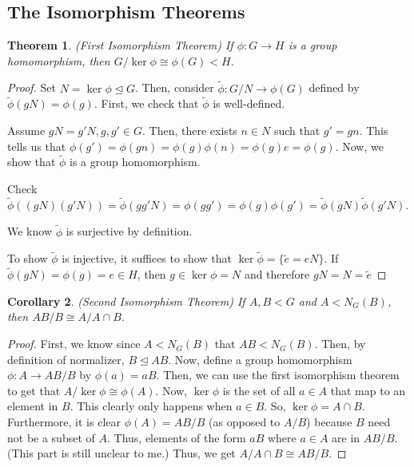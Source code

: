 \documentclass[11pt,leqno,oneside]{amsart}
\newcommand{\subgroup}{\mathrel{<}}
\newcommand{\normsubgroup}{\mathrel{\unlhd}}
\newcommand{\isom}{\mathrel{\cong}}
\newtheorem{thm}{Theorem}[subsection]
\newtheorem{cor}[thm]{Corollary}
\theoremstyle{definition}
\numberwithin{equation}{section}
\begin{document}
\subsection*{The Isomorphism Theorems}
\begin{thm}
    (First Isomorphism Theorem) If $\phi: G \to H$ is a group homomorphism, then $G/\ker \phi \isom \phi(G) \subgroup H$.
\end{thm}
\begin{proof}
    Set $N = \ker \phi \normsubgroup G$. Then, consider $\widetilde{\phi}: G/N
    \to \phi(G)$ defined by $\widetilde{\phi}(gN) = \phi(g)$. First, we check
    that $\widetilde{\phi}$ is well-defined.

    Assume $gN = g'N, g,g' \in G$. Then, there exists $n \in N$ such that $g'
    = gn$. This tells us that $\phi(g') = \phi(gn) = \phi(g)\phi(n) = \phi(g)e
    = \phi(g)$. Now, we show that $\widetilde{\phi}$ is a group homomorphism.

    Check $\widetilde{\phi}( (gN)(g'N) ) = \widetilde{\phi}(gg'N) = \phi(gg') =
    \phi(g)\phi(g') = \widetilde{\phi}(gN) \widetilde{\phi}(g'N)$.

    We know $\widetilde{\phi}$ is surjective by definition.

    To show $\widetilde{\phi}$ is injective, it suffices to show that $\ker
    \widetilde{\phi} = \{\widetilde{e} = eN\}$. If $\widetilde{\phi}(gN) =
    \phi(g) = e \in H$, then $g \in \ker \phi = N$ and therefore $gN = N =
    \widetilde{e}$
\end{proof}
\begin{cor}
    (Second Isomorphism Theorem) If $A,B \subgroup G$ and $A \subgroup N_G(B)$,
    then $AB/B \isom A/A\cap B$.
\end{cor}
\begin{proof}
    First, we know since $A \subgroup N_G(B)$ that $AB \subgroup N_G(B)$. Then,
    by definition of normalizer, $B \normsubgroup AB$. Now, define a group
    homomorphism $\phi: A \to AB/B$ by $\phi(a) = aB$. Then, we can use the
    first isomorphism theorem to get that $A/\ker \phi \isom \phi(A)$. Now,
    $\ker \phi$ is the set of all $a \in A$ that map to an element in $B$. This
    clearly only happens when $a \in B$. So, $\ker \phi = A \cap B$.
    Furthermore, it is clear $\phi(A) = AB/B$ (as opposed to $A/B$) because $B$
    need not be a subset of $A$. Thus, elements of the form $aB$ where $a \in A$
    are in $AB/B$. (This part is still unclear to me.) Thus, we get $A/A \cap B
    \isom AB/B$.
\end{proof}
\end{document}
